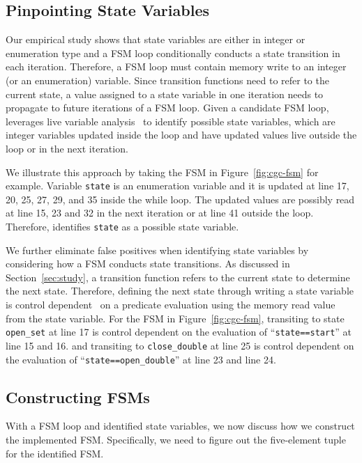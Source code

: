 \subsection{Pinpointing State Variables}

Our empirical study shows that state variables are either in integer or enumeration type
and a FSM loop conditionally conducts a state transition in each iteration. 
Therefore, a FSM loop must contain memory write to an integer 
(or an enumeration) variable. 
Since transition functions need to refer to the current state, 
a value assigned to a state variable in one iteration needs 
to propagate to future iterations of a FSM loop. 
Given a candidate FSM loop, \Tool{} leverages live variable 
analysis~\cite{live-analysis} to 
identify possible state variables, which are integer variables 
updated inside the loop and have updated values live outside the loop 
or in the next iteration. 

We illustrate this approach by taking the FSM 
in Figure~\ref{fig:cgc-fsm} for example. 
Variable \texttt{state} is an enumeration variable and it is updated at 
line 17, 20, 25, 27, 29, and 35 inside the while loop. 
The updated values are possibly read at line 15, 23 and 32 
in the next iteration or at line 41 outside the loop.
Therefore, \Tool{} identifies \texttt{state} as a possible 
state variable.  


We further eliminate false positives when identifying state variables 
by considering how a FSM conducts state transitions. 
As discussed in Section~\ref{sec:study}, 
a transition function refers to the current state to determine the next state. 
Therefore, defining the next state through writing a state variable 
is control dependent~\cite{cdg} on a predicate evaluation using the memory read value
from the state variable. 
For the FSM in Figure~\ref{fig:cgc-fsm}, 
transiting to state \texttt{open\_set} at line 17
is control dependent on the evaluation of ``\texttt{state==start}'' at line 15 and 16. 
and transiting to \texttt{close\_double} at line 25 is control dependent on the 
evaluation of ``\texttt{state==open\_double}'' at line 23 and line 24. 

\subsection{Constructing FSMs}

With a FSM loop and identified state variables, 
we now discuss how we construct the implemented FSM. 
Specifically, we need to figure out the five-element tuple for the identified FSM. 

